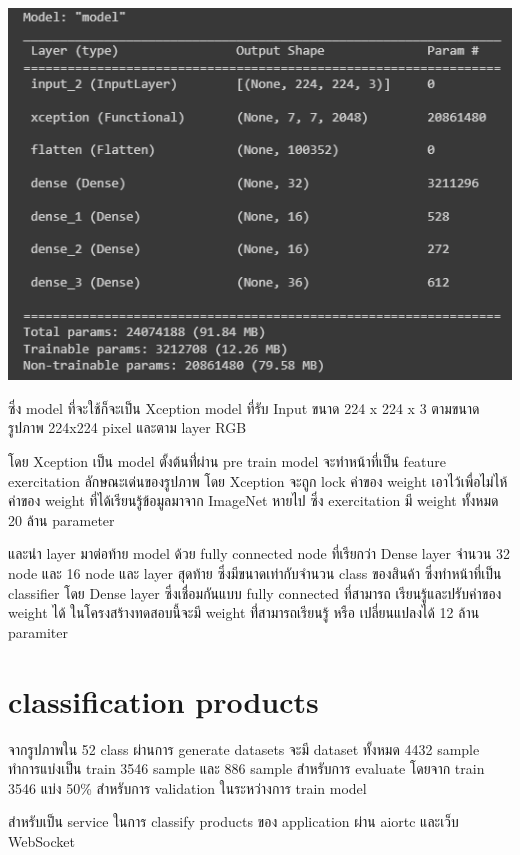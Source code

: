 \begin{center}
  \includegraphics[scale=0.5]{pic/model/model.png}
\end{center}

ซึ่ง model ที่จะใช้ก็จะเป็น Xception model ที่รับ Input ขนาด 224 x 224 x 3 ตามขนาดรูปภาพ 224x224 pixel และตาม layer RGB

โดย Xception เป็น model ตั้งต้นที่่ผ่าน pre train model จะทำหน้าที่เป็น feature exercitation ลักษณะเด่นของรูปภาพ
โดย Xception จะถูก lock ค่าของ weight เอาไว้เพื่อไม่ไห้ค่าของ weight ที่ได้เรียนรู้ข้อมูลมาจาก ImageNet หายไป
ซึ่ง exercitation มี weight ทั้งหมด 20 ล้าน parameter

และนำ layer มาต่อท้าย model ด้วย fully connected node ที่เรียกว่า Dense layer จำนวน 32 node และ 16 node และ
layer สุดท้าย ซึ่งมีขนาดเท่ากับจำนวน class ของสินค้า ซึ่งทำหน้าที่เป็น classifier
โดย Dense layer ซึ่งเชื่อมกันแบบ fully connected ที่สามารถ เรียนรู้และปรับค่าของ weight ได้
ในโครงสร้างทดสอบนี้จะมี weight ที่่สามารถเรียนรู้ หรือ เปลี่ยนแปลงได้ 12 ล้าน paramiter


\section{classification products}
จากรูปภาพใน 52 class ผ่านการ generate datasets จะมี dataset ทั้งหมด 4432 sample
ทำการแบ่งเป็น train 3546 sample และ  886 sample สำหรับการ evaluate
โดยจาก train 3546 แบ่ง 50\% สำหรับการ validation ในระหว่างการ train model

สำหรับเป็น service ในการ classify products ของ application ผ่าน aiortc  และเว็บ WebSocket



